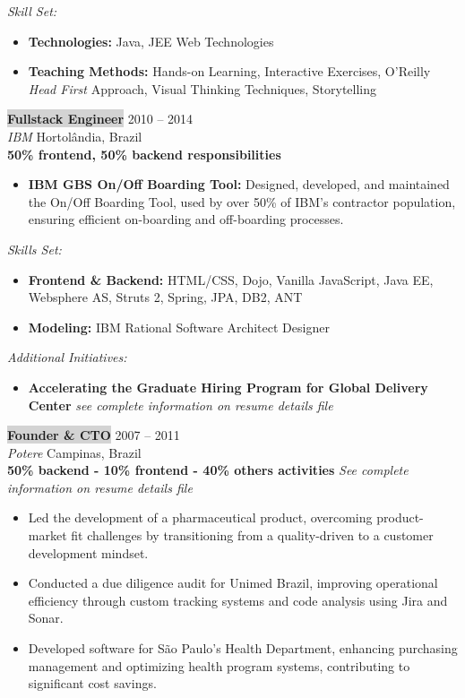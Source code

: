 \documentclass{resume} %
\begin{document}
\textit{Skill Set:}
\begin{itemize}
    \item \textbf{Technologies:} Java, JEE Web Technologies
    \item \textbf{Teaching Methods:} Hands-on Learning, Interactive Exercises, O'Reilly \textit{Head First} Approach, Visual Thinking Techniques, Storytelling
\end{itemize}
\hfill

\colorbox{lightgray}{\textbf{Fullstack Engineer}} \hfill 2010 -- 2014\\
\textit{IBM} \hfill Hortolândia, Brazil\\
\textbf{50\% frontend, 50\% backend responsibilities}
\begin{itemize}
    \item \textbf{IBM GBS On/Off Boarding Tool:} Designed, developed, and maintained the On/Off Boarding Tool, used by over 50\% of IBM's contractor population, ensuring efficient on-boarding and off-boarding processes.
\end{itemize}

\textit{Skills Set:}
\begin{itemize}
    \item \textbf{Frontend \& Backend:} HTML/CSS, Dojo, Vanilla JavaScript, Java EE, Websphere AS, Struts 2, Spring, JPA, DB2, ANT
    \item \textbf{Modeling:} IBM Rational Software Architect Designer
\end{itemize}

\textit{Additional Initiatives:}
\begin{itemize}
    \item \textbf{Accelerating the Graduate Hiring Program for Global Delivery Center} \textit{see complete information on resume details file}
\end{itemize}

\hfill

\colorbox{lightgray}{\textbf{Founder \& CTO}} \hfill 2007 -- 2011\\
\textit{Potere} \hfill Campinas, Brazil\\
\textbf{50\% backend - 10\% frontend - 40\% others activities}
\textit{See complete information on resume details file}
\begin{itemize}
    \item Led the development of a pharmaceutical product, overcoming product-market fit challenges by transitioning from a quality-driven to a customer development mindset.
    \item Conducted a due diligence audit for Unimed Brazil, improving operational efficiency through custom tracking systems and code analysis using Jira and Sonar.
    \item Developed software for São Paulo’s Health Department, enhancing purchasing management and optimizing health program systems, contributing to significant cost savings.
\end{itemize}
\hfill \break
\end{document}
